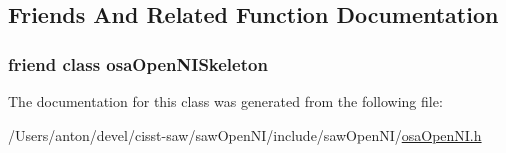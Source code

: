 \subsection{Friends And Related Function Documentation}
\hypertarget{classosa_open_n_i_a7c2cdffe82d515f12a725b676dd0080b}{}
\subsubsection[{osa\+Open\+N\+I\+Skeleton}]{\setlength{\rightskip}{0pt plus 5cm}friend class {\bf osa\+Open\+N\+I\+Skeleton}\hspace{0.3cm}{\ttfamily [friend]}}\label{classosa_open_n_i_a7c2cdffe82d515f12a725b676dd0080b}


The documentation for this class was generated from the following file\+:\begin{DoxyCompactItemize}
\item 
/\+Users/anton/devel/cisst-\/saw/saw\+Open\+N\+I/include/saw\+Open\+N\+I/\hyperlink{osa_open_n_i_8h}{osa\+Open\+N\+I.\+h}\end{DoxyCompactItemize}
